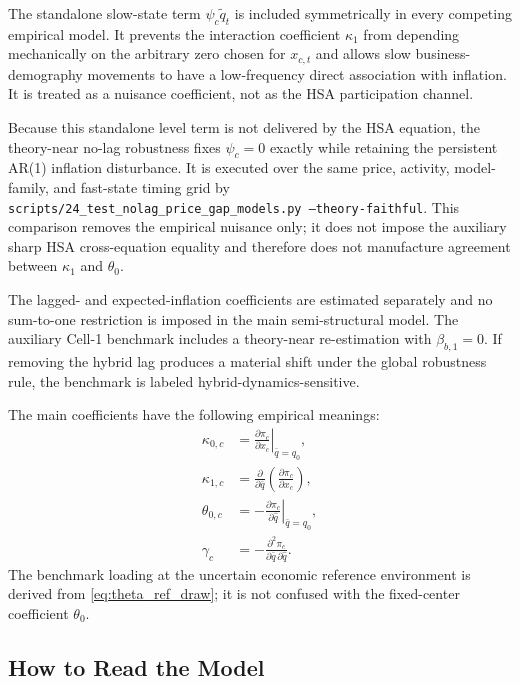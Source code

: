 \documentclass[11pt]{article}
\begin{document}
The standalone slow-state term $\psi_c\tilde q_t$ is included symmetrically in every competing empirical model. It prevents the interaction coefficient $\kappa_1$ from depending mechanically on the arbitrary zero chosen for $x_{c,t}$ and allows slow business-demography movements to have a low-frequency direct association with inflation. It is treated as a nuisance coefficient, not as the HSA participation channel.

Because this standalone level term is not delivered by the HSA equation, the
theory-near no-lag robustness fixes $\psi_c=0$ exactly while retaining the
persistent AR(1) inflation disturbance.  It is executed over the same price,
activity, model-family, and fast-state timing grid by
\texttt{scripts/24\_test\_nolag\_price\_gap\_models.py
--theory-faithful}.  This comparison removes the empirical nuisance only; it
does not impose the auxiliary sharp HSA cross-equation equality and therefore
does not manufacture agreement between $\kappa_1$ and $\theta_0$.

The lagged- and expected-inflation coefficients are estimated separately and no sum-to-one restriction is imposed in the main semi-structural model. The auxiliary Cell-1 benchmark includes a theory-near re-estimation with $\beta_{b,1}=0$. If removing the hybrid lag produces a material shift under the global robustness rule, the benchmark is labeled hybrid-dynamics-sensitive.

The main coefficients have the following empirical meanings:
\begin{align}
\kappa_{0,c}&=\left.\frac{\partial\pi_c}{\partial x_c}\right|_{\bar q=q_0},\\
\kappa_{1,c}&=\frac{\partial}{\partial\bar q}\left(\frac{\partial\pi_c}{\partial x_c}\right),\\
\theta_{0,c}&=-\left.\frac{\partial\pi_c}{\partial\hat q}\right|_{\bar q=q_0},\\
\gamma_c&=-\frac{\partial^2\pi_c}{\partial\bar q\,\partial\hat q}.
\end{align}
The benchmark loading at the uncertain economic reference environment is derived from \cref{eq:theta_ref_draw}; it is not confused with the fixed-center coefficient $\theta_0$.

\subsection{How to Read the Model}
\end{document}
